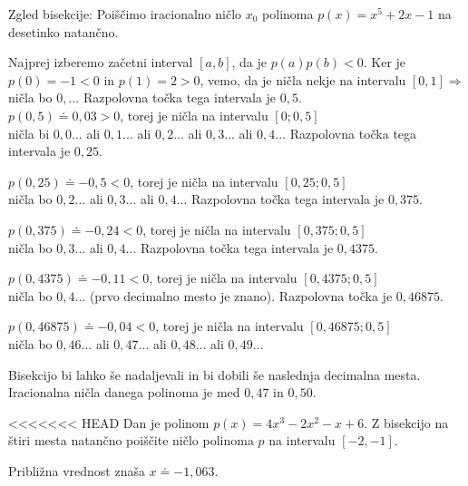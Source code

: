 \begin{vaja}

Zgled bisekcije:
Poiščimo iracionalno ničlo $x_0$ polinoma $p(x)=x^5+2x-1$ na desetinko natančno.

Najprej izberemo začetni interval $[a,b]$, da je $p(a)p(b)<0$. Ker je $p(0)=-1<0$ in $p(1)=2>0$, 
vemo, da je ničla nekje na intervalu $[0,1] \Rightarrow$ \\
ničla bo $0,...$ Razpolovna točka tega intervala je $0,5$. \\
$p(0,5)\doteq 0,03>0$, torej je ničla na intervalu $[0;0,5]$ \Rightarrow \\

ničla bi $0,0...$ ali $0,1...$ ali $0,2...$ ali $0,3...$ ali $0,4...$ Razpolovna točka tega intervala je $0,25$.

$p(0,25)\doteq-0,5<0$, torej je ničla na intervalu $[0,25;0,5]$ \Rightarrow \\
ničla bo $0,2...$ ali $0,3...$ ali $0,4...$ Razpolovna točka tega intervala je $0,375$.

$p(0,375)\doteq -0,24<0$, torej je ničla na intervalu $[0,375;0,5]$ \Rightarrow \\
ničla bo $0,3...$ ali $0,4...$ Razpolovna točka tega intervala je $0,4375$.

$p(0,4375)\doteq -0,11<0$, torej je ničla na intervalu $[0,4375;0,5]$ \Rightarrow \\
ničla bo $0,4...$ (prvo decimalno mesto je znano). Razpolovna točka je $0,46875$.

$p(0,46875)\doteq -0,04<0$, torej je ničla na intervalu $[0,46875;0,5]$ \Rightarrow \\
ničla bo $0,46...$ ali $0,47...$ ali $0,48...$ ali $0,49$...

Bisekcijo bi lahko še nadaljevali in bi dobili še naslednja decimalna mesta.
Iracionalna ničla danega polinoma je med $0,47$ in $0,50$.



\end{vaja}

\begin{vaja}
<<<<<<< HEAD
Dan je polinom $p(x)=4x^3-2x^2-x+6$. Z bisekcijo na štiri mesta natančno poiščite ničlo
polinoma $p$ na intervalu $[-2,-1]$.


\begin{odgovor}
Približna vrednost znaša $x\doteq -1,063$.
\end{odgovor}

\end{vaja}







